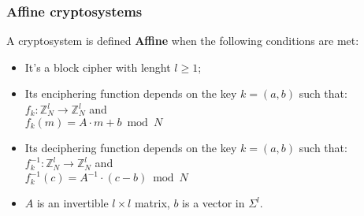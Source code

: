 \subsubsection{Affine cryptosystems}
\begin{definition}
    A cryptosystem is defined \textbf{Affine} when the following conditions are met:
    \begin{itemize}
        \item It's a block cipher with lenght $l \geq 1$;
        \item Its enciphering function depends on the key $k = (a,b)$ such that:\\
        $f_{k}: \mathbb{Z}_{N}^{l} \rightarrow \mathbb{Z}_{N}^{l}$ and \\
        $f_{k}(m) = A \cdot m + b \bmod N$
        \item Its deciphering function depends on the key $k = (a,b)$ such that:\\
        $f_{k}^{-1}: \mathbb{Z}_{N}^{l} \rightarrow \mathbb{Z}_{N}^{l}$ and \\
        $f_{k}^{-1}(c) = A^{-1} \cdot (c - b) \bmod N$
        \item $A$ is an invertible $l \times l$ matrix, $b$ is a vector in $\Sigma^{l}$.
    \end{itemize}
\end{definition}

